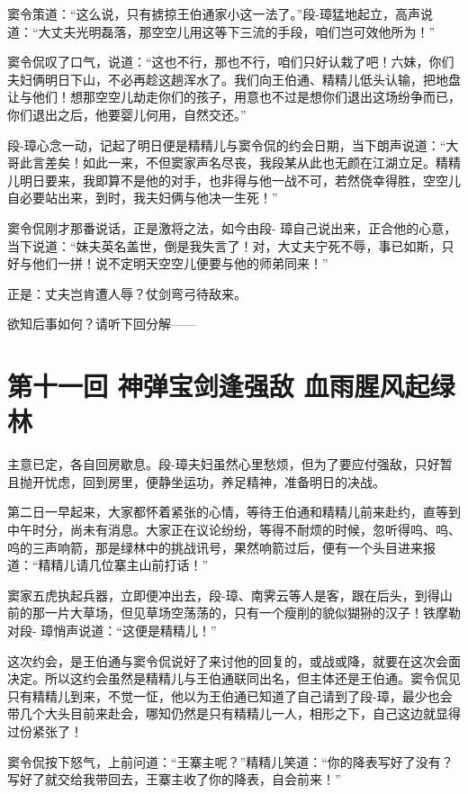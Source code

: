 \documentclass[12pt,oneside]{book}
\begin{document}
窦令策道：``这么说，只有掳掠王伯通家小这一法了。''段-璋猛地起立，高声说道：``大丈夫光明磊落，那空空儿用这等下三流的手段，咱们岂可效他所为！''

窦令侃叹了口气，说道：``这也不行，那也不行，咱们只好认栽了吧！六妹，你们夫妇俩明日下山，不必再趁这趟浑水了。我们向王伯通、精精儿低头认输，把地盘让与他们！想那空空儿劫走你们的孩子，用意也不过是想你们退出这场纷争而已，你们退出之后，他要婴儿何用，自然交还。''

段-璋心念一动，记起了明日便是精精儿与窦令侃的约会日期，当下朗声说道：``大哥此言差矣！如此一来，不但窦家声名尽丧，我段某从此也无颜在江湖立足。精精儿明日要来，我即算不是他的对手，也非得与他一战不可，若然侥幸得胜，空空儿自必要站出来，到时，我夫妇俩与他决一生死！''

窦令侃刚才那番说话，正是激将之法，如今由段-
璋自己说出来，正合他的心意，当下说道：``妹夫英名盖世，倒是我失言了！对，大丈夫宁死不辱，事已如斯，只好与他们一拼！说不定明天空空儿便要与他的师弟同来！''

正是：丈夫岂肯遭人辱？仗剑弯弓待敌来。

欲知后事如何？请听下回分解------

\chapter{第十一回 神弹宝剑逢强敌
血雨腥风起绿林}\label{ux7b2cux5341ux4e00ux56de-ux795eux5f39ux5b9dux5251ux9022ux5f3aux654c-ux8840ux96e8ux8165ux98ceux8d77ux7effux6797}

主意已定，各自回房歇息。段-璋夫妇虽然心里愁烦，但为了要应付强敌，只好暂且抛开忧虑，回到房里，便静坐运功，养足精神，准备明日的决战。

第二日一早起来，大家都怀着紧张的心情，等待王伯通和精精儿前来赴约，直等到中午时分，尚未有消息。大家正在议论纷纷，等得不耐烦的时候，忽听得呜、呜、呜的三声响箭，那是绿林中的挑战讯号，果然响箭过后，便有一个头目进来报道：``精精儿请几位寨主山前打话！''

窦家五虎执起兵器，立即便冲出去，段-璋、南霁云等人是客，跟在后头，到得山前的那一片大草场，但见草场空荡荡的，只有一个瘦削的貌似猢狲的汉子！铁摩勒对段-
璋悄声说道：``这便是精精儿！''

这次约会，是王伯通与窦令侃说好了来讨他的回复的，或战或降，就要在这次会面决定。所以这约会虽然是精精儿与王伯通联同出名，但主体还是王伯通。窦令侃见只有精精儿到来，不觉一怔，他以为王伯通已知道了自己请到了段-璋，最少也会带几个大头目前来赴会，哪知仍然是只有精精儿一人，相形之下，自己这边就显得过份紧张了！

窦令侃按下怒气，上前问道：``王寨主呢？''精精儿笑道：``你的降表写好了没有？写好了就交给我带回去，王寨主收了你的降表，自会前来！''
\end{document}
